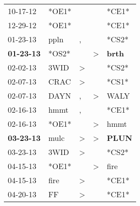 \begin{supertabular}{p{0.07\textwidth}p{0.06\textwidth}p{0.02\textwidth}p{0.02\textwidth}p{0.06\textwidth}}
          10-17-12\textsuperscript{} &                            *OE1* &                  &                  &                            *CE1* \\
          12-29-12\textsuperscript{} &                            *OE1* &                  &                  &                            *CE1* \\
          01-23-13\textsuperscript{} &           ppln\textsuperscript{} &                , &                  &                            *CS2* \\
 \textbf{01-23-13\textsuperscript{}} &                            *OS2* &                  &     \textgreater &  \textbf{brth\textsuperscript{}} \\
          02-02-13\textsuperscript{} &           3WID\textsuperscript{} &     \textgreater &                  &                            *CS2* \\
          02-07-13\textsuperscript{} &           CRAC\textsuperscript{} &     \textgreater &                  &                            *CS1* \\
          02-07-13\textsuperscript{} &           DAYN\textsuperscript{} &                , &     \textgreater &           WALY\textsuperscript{} \\
          02-16-13\textsuperscript{} &           hmmt\textsuperscript{} &                , &                  &                            *CE1* \\
          02-16-13\textsuperscript{} &                            *OE1* &                  &     \textgreater &           hmmt\textsuperscript{} \\
 \textbf{03-23-13\textsuperscript{}} &           mulc\textsuperscript{} &     \textgreater &     \textgreater &  \textbf{PLUN\textsuperscript{}} \\
          03-23-13\textsuperscript{} &           3WID\textsuperscript{} &     \textgreater &                  &                            *CS2* \\
          04-15-13\textsuperscript{} &                            *OE1* &                  &     \textgreater &           fire\textsuperscript{} \\
          04-15-13\textsuperscript{} &           fire\textsuperscript{} &     \textgreater &                  &                            *CE1* \\
          04-20-13\textsuperscript{} &             FF\textsuperscript{} &     \textgreater &                  &                            *CE1* \\

\end{supertabular}
